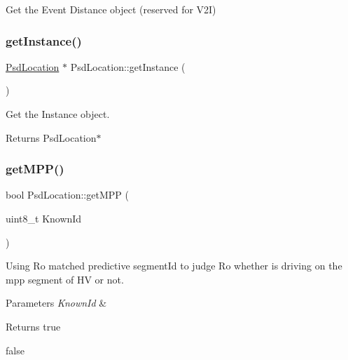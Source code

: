 Get the Event Distance object (reserved for V2I) 

\mbox{\label{class_psd_location_a0ec04eadcec725922d8413aa59d3cb07}} 
\subsubsection{\texorpdfstring{get\+Instance()}{getInstance()}}
{\footnotesize\ttfamily \hyperlink{class_psd_location}{Psd\+Location} $\ast$ Psd\+Location\+::get\+Instance (\begin{DoxyParamCaption}{ }\end{DoxyParamCaption})\hspace{0.3cm}{\ttfamily [static]}}



Get the Instance object. 

\begin{DoxyReturn}{Returns}
Psd\+Location$\ast$ 
\end{DoxyReturn}
\mbox{\label{class_psd_location_a07faf8dd338c17fb33e5978b90938c22}} 
\subsubsection{\texorpdfstring{get\+M\+P\+P()}{getMPP()}}
{\footnotesize\ttfamily bool Psd\+Location\+::get\+M\+PP (\begin{DoxyParamCaption}\item[{uint8\+\_\+t}]{Known\+Id }\end{DoxyParamCaption})}



Using Ro matched predictive segment\+Id to judge Ro whether is driving on the mpp segment of HV or not. 


\begin{DoxyParams}{Parameters}
{\em Known\+Id} & \\
\hline
\end{DoxyParams}
\begin{DoxyReturn}{Returns}
true 

false 
\end{DoxyReturn}
\mbox{\label{class_psd_location_aef776415f675a76e9b4c100534ba8ac5}} 
